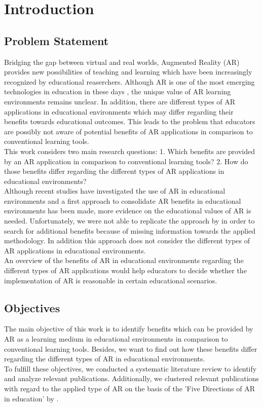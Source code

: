 \section{Introduction}
\label{sec:Introduction}
\subsection{Problem Statement}
\label{subsec:ProblemStatement}
Bridging the gap between virtual and real worlds, Augmented Reality (AR) provides new possibilities of teaching and learning which have been increasingly recognized by educational reaserchers. \autocite [cf.][41]{Wu.2013} Although AR is one of the most emerging technologies in education in these days \autocite [cf.][21]{Johnson.2010}, the unique value of AR learning environments remains unclear.\autocite[\label{fn:Wu_2013_48}cf.][48]{Wu.2013} In addition, there are different types of AR applications in educational environments which may differ regarding their benefits towards educational outcomes. \autocite [cf.][127-130]{Yuen.2011} This leads to the problem that educators are possibly not aware of potential benefits of AR applications in comparison to conventional learning tools. \\
This work considers two main research questions: 1. Which benefits are provided by an AR application in comparison to conventional learning tools? 2. How do those benefits differ regarding the different types of AR applications in educational environments? \\
Although recent studies have investigated the use of AR in educational environments \autocite {Wu.2013}\mulcit\autocite {Lee.2012} and a first approach to consolidate AR benefits in educational environments has been made, \autocite [cf.][]{Radu.2014} more evidence on the educational values of AR is needed. Unfortunately, we were not able to replicate the approach by \cite{Radu.2014} in order to search for additional benefits because of missing information towards the applied methodology. In addition this approach does not consider the different types of AR applications in educational environments.\\
An overview of the benefits of AR in educational environments regarding the different types of AR applications would help educators to decide whether the implementation of AR is reasonable in certain educational scenarios.\\
\subsection{Objectives}
\label{subsec:Objectives}
The main objective of this work is to identify benefits which can be provided by AR as a learning medium in educational environments in comparison to conventional learning tools. Besides, we want to find out how these benefits differ regarding the different types of AR in educational environments. \\
To fulfill these objectives, we conducted a systematic literature review to identify and analyze relevant publications. Additionally, we clustered relevant publications with regard to the applied type of AR on the basis of the 'Five Directions of AR in education' by \cite{Yuen.2011}.
